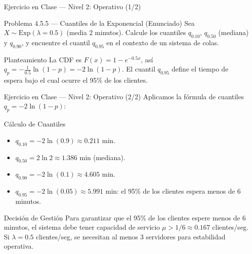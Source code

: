 \documentclass[10pt, aspectratio=169]{beamer}
\begin{document}
\begin{frame}{Ejercicio en Clase --- Nivel 2: Operativo (1/2)}
  \footnotesize
  \begin{block}{Problema 4.5.5 --- Cuantiles de la Exponencial (Enunciado)}
    Sea $X \sim \text{Exp}(\lambda = 0.5)$ (media 2 minutos). Calcule los cuantiles $q_{0.10}$, $q_{0.50}$ (mediana) y $q_{0.90}$, y encuentre el cuantil $q_{0.95}$ en el contexto de un sistema de colas.
  \end{block}

  \vspace{0.15cm}
  \pause
  \begin{alertblock}{Planteamiento}
    \scriptsize
    La CDF es $F(x) = 1 - e^{-0.5 x}$, así $q_{p} = -\frac{1}{0.5}\ln(1-p) = -2\ln(1-p)$. El cuantil $q_{0.95}$ define el tiempo de espera bajo el cual ocurre el 95\% de los clientes.
  \end{alertblock}
\end{frame}

\begin{frame}{Ejercicio en Clase --- Nivel 2: Operativo (2/2)}
  \scriptsize
  Aplicamos la fórmula de cuantiles $q_{p} = -2\ln(1-p)$: \pause

  \vspace{0.05cm}
  \begin{block}{Cálculo de Cuantiles}
    \begin{itemize}\itemsep=0.05cm
      \item $q_{0.10} = -2\ln(0.9) \approx 0.211$ min. \pause
      \item $q_{0.50} = 2\ln 2 \approx 1.386$ min (mediana). \pause
      \item $q_{0.90} = -2\ln(0.1) \approx 4.605$ min. \pause
      \item $q_{0.95} = -2\ln(0.05) \approx 5.991$ min: el 95\% de los clientes espera menos de 6 minutos.
    \end{itemize}
  \end{block}

  \vspace{0.05cm}
  \pause
  \begin{alertblock}{Decisión de Gestión}
    \scriptsize
    Para garantizar que el 95\% de los clientes espere menos de 6 minutos, el sistema debe tener capacidad de servicio $\mu > 1/6 \approx 0.167$ clientes/seg. Si $\lambda = 0.5$ clientes/seg, se necesitan al menos 3 servidores para estabilidad operativa.
  \end{alertblock}
\end{frame}
\end{document}
